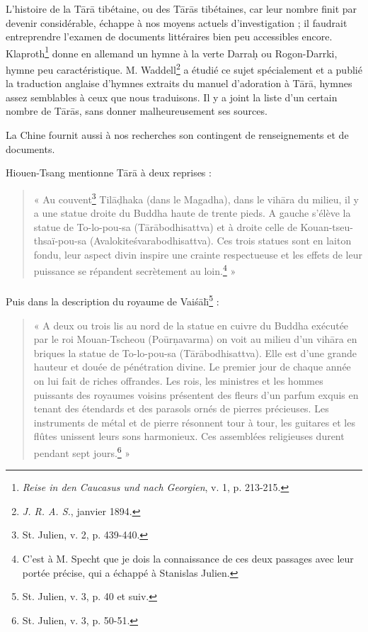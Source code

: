 \documentclass[a4paper, 11pt, oneside, french]{article}
\begin{document}
L'histoire de la T\={a}r\={a} tibétaine, ou des T\={a}r\={a}s tibétaines, car leur nombre finit par devenir considérable, échappe à nos moyens actuels d'investigation ; il faudrait entreprendre l'examen de documents littéraires bien peu accessibles encore. Klaproth\footnote{\emph{Reise in den Caucasus und nach Georgien}, v. 1, p. 213-215.} donne en allemand un hymne à la verte Darra\d{h} ou Rogon-Darrki, hymne peu caractéristique. M. Waddell\footnote{\emph{J. R. A. S.}, janvier 1894.} a étudié ce sujet spécialement et a publié la traduction anglaise d'hymnes extraits du manuel d'adoration à T\={a}r\={a}, hymnes assez semblables à ceux que nous traduisons. Il y a joint la liste d'un certain nombre de T\={a}r\={a}s, sans donner malheureusement ses sources.

La Chine fournit aussi à nos recherches son contingent de renseignements et de documents.

Hiouen-Tsang mentionne T\={a}r\={a} à deux reprises :
\begin{quotation}
« Au couvent\footnote{St. Julien, v. 2, p. 439-440.} Til\={a}\d{d}haka (dans le Magadha), dans le vih\={a}ra du milieu, il y a une statue droite du Buddha haute de trente pieds. A gauche s'élève la statue de To-lo-pou-sa (T\={a}r\={a}bodhisattva) et à droite celle de Kouan-tseu-thsaï-pou-sa (Avalokite\'{s}varabodhisattva). Ces trois statues sont en laiton fondu, leur aspect divin inspire une crainte respectueuse et les effets de leur puissance se répandent secrètement au loin.\footnote{C'est à M. Specht que je dois la connaissance de ces deux passages avec leur portée précise, qui a échappé à Stanislas Julien.} »
\end{quotation}
\paragraph{}
Puis dans la description du royaume de Vai\'{s}\={a}l\={\i}\footnote{St. Julien, v. 3, p. 40 et suiv.} :
\begin{quotation}
« A deux ou trois lis au nord de la statue en cuivre du Buddha exécutée par le roi Mouan-Tscheou (Po\={u}r\d{n}avarma) on voit au milieu d'un vih\={a}ra en briques la statue de To-lo-pou-sa (T\={a}r\={a}bodhisattva). Elle est d'une grande hauteur et douée de pénétration divine. Le premier jour de chaque année on lui fait de riches offrandes. Les rois, les ministres et les hommes puissants des royaumes voisins présentent des fleurs d'un parfum exquis en tenant des étendards et des parasols ornés de pierres précieuses. Les instruments de métal et de pierre résonnent tour à tour, les guitares et les flûtes unissent leurs sons harmonieux. Ces assemblées religieuses durent pendant sept jours.\footnote{St. Julien, v. 3, p. 50-51.} »
\end{quotation}
\end{document}
